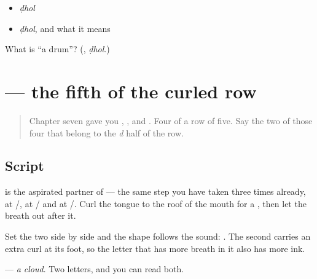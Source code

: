 \begin{itemize}
\raggedright
  \item \emph{ḍhol}
  \item \emph{ḍhol}, and what it means
\end{itemize}

\begin{tcolorbox}[breakable,colback=teal!4,colframe=teal!35!black,title={Before you move on}]
What is \textquotedblleft{}a drum\textquotedblright{}? (\textbf{}, \emph{ḍhol}.)
\end{tcolorbox}
\section[\texorpdfstring{\mr{ढ} (ddha)}{ढ (ddha)}]{ — the fifth of the curled row}

\label{lesson:MR-W64-ddha}



\begin{quote}
Chapter seven gave you \textbf{}, \textbf{}, \textbf{} and \textbf{}. Four of a row of five. Say the two of those four that belong to the \emph{d} half of the row.
\end{quote}

\subsection*{Script}
\begin{quote}
\end{quote}

\textbf{} is the aspirated partner of \textbf{} — the same step you have taken three times already, at \textbf{}/\textbf{}, at \textbf{}/\textbf{} and at \textbf{}/\textbf{}. Curl the tongue to the roof of the mouth for a \textbf{}, then let the breath out after it.

Set the two side by side and the shape follows the sound: \textbf{ }. The second carries an extra curl at its foot, so the letter that has more breath in it also has more ink.

\textbf{} — \emph{a cloud}. Two letters, and you can read both.

